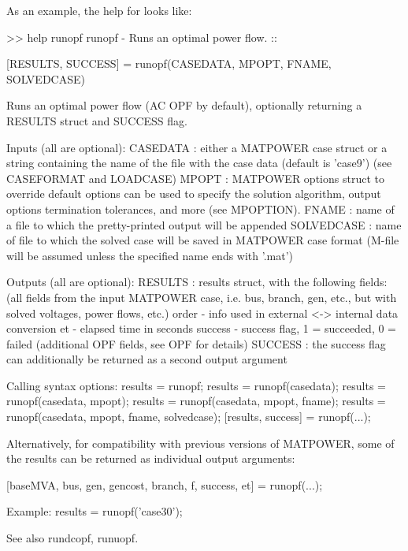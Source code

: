\documentclass[12pt]{article}
\newcommand{\code}[1]{{\relsize{-0.5}{\tt{{#1}}}}}  %
\numberwithin{equation}{section}
\numberwithin{table}{section}
\numberwithin{figure}{section}
\begin{document}
As an example, the help for \code{runopf} looks like:
\begin{Code}
>> help runopf
  runopf - Runs an optimal power flow.
  ::
 
    [RESULTS, SUCCESS] = runopf(CASEDATA, MPOPT, FNAME, SOLVEDCASE)
 
    Runs an optimal power flow (AC OPF by default), optionally returning
    a RESULTS struct and SUCCESS flag.
 
    Inputs (all are optional):
        CASEDATA : either a MATPOWER case struct or a string containing
            the name of the file with the case data (default is 'case9')
            (see CASEFORMAT and LOADCASE)
        MPOPT : MATPOWER options struct to override default options
            can be used to specify the solution algorithm, output options
            termination tolerances, and more (see MPOPTION).
        FNAME : name of a file to which the pretty-printed output will
            be appended
        SOLVEDCASE : name of file to which the solved case will be saved
            in MATPOWER case format (M-file will be assumed unless the
            specified name ends with '.mat')
 
    Outputs (all are optional):
        RESULTS : results struct, with the following fields:
            (all fields from the input MATPOWER case, i.e. bus, branch,
                gen, etc., but with solved voltages, power flows, etc.)
            order - info used in external <-> internal data conversion
            et - elapsed time in seconds
            success - success flag, 1 = succeeded, 0 = failed
            (additional OPF fields, see OPF for details)
        SUCCESS : the success flag can additionally be returned as
            a second output argument
 
    Calling syntax options:
        results = runopf;
        results = runopf(casedata);
        results = runopf(casedata, mpopt);
        results = runopf(casedata, mpopt, fname);
        results = runopf(casedata, mpopt, fname, solvedcase);
        [results, success] = runopf(...);
 
        Alternatively, for compatibility with previous versions of MATPOWER,
        some of the results can be returned as individual output arguments:
 
        [baseMVA, bus, gen, gencost, branch, f, success, et] = runopf(...);
 
    Example:
        results = runopf('case30');
 
  See also rundcopf, runuopf.
\end{Code}
\end{document}

